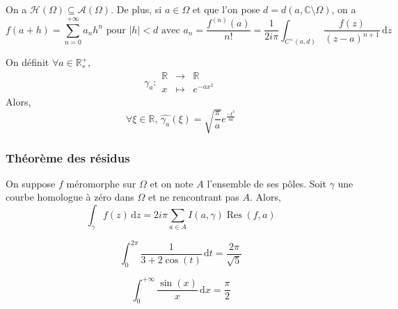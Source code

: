 
  \begin{corollary}
    On a $\mathcal{H}(\Omega) \subseteq \mathcal{A}(\Omega)$. De plus, si $a \in \Omega$ et que l'on pose $d = d(a, \mathbb{C} \setminus \Omega)$, on a
    \[ f(a + h) = \sum_{n=0}^{+\infty} a_n h^n \text{ pour } \vert h \vert < d \text{ avec } a_n = \frac{f^{(n)}(a)}{n!} = \frac{1}{2i\pi} \int_{C^+(a,d)} \frac{f(z)}{(z-a)^{n+1}} \, \mathrm{d}z \]
  \end{corollary}


  \begin{application}
    On définit $\forall a \in \mathbb{R}^+_*$,
    \[ \gamma_a :
    \begin{array}{ccc}
      \mathbb{R} &\rightarrow& \mathbb{R} \\
      x &\mapsto& e^{-ax^2}
    \end{array}
    \]
    Alors,
    \[ \forall \xi \in \mathbb{R}, \, \widehat{\gamma_a}(\xi) = \sqrt{\frac{\pi}{a}} e^{\frac{- \xi^2}{4a}} \]
  \end{application}

  \subsubsection{Théorème des résidus}


  \begin{theorem}
    On suppose $f$ méromorphe sur $\Omega$ et on note $A$ l'ensemble de ses pôles. Soit $\gamma$ une courbe homologue à zéro dans $\Omega$ et ne rencontrant pas $A$. Alors,
    \[ \int_\gamma f(z) \, \mathrm{d}z = 2i\pi \sum_{a \in A} I(a, \gamma) \operatorname{Res}(f, a) \]
  \end{theorem}


  \begin{example}
    \[ \int_{0}^{2\pi} \frac{1}{3 + 2\cos(t)} \, \mathrm{d}t = \frac{2\pi}{\sqrt{5}} \]
  \end{example}

  \begin{example}
    \[ \int_{0}^{+\infty} \frac{\sin(x)}{x} \, \mathrm{d}x = \frac{\pi}{2} \]
  \end{example}

